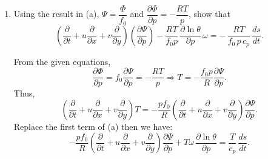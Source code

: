 \documentclass[11pt,a4paper]{article}
\begin{document}
{\begin{enumerate}[label=(\alph*)]
    \item Using the result in (a), $\Psi = \dfrac{\Phi}{f_0}$ and $\dfrac{\partial\Phi}{\partial p} = -\dfrac{RT}{p}$, show that
    \[
        \left(\frac{\partial}{\partial t} + u\frac{\partial}{\partial x} + v\frac{\partial}{\partial y}\right) \left(\frac{\partial\Psi}{\partial p}\right) - \frac{RT}{f_0 p}\,\frac{\partial\ln\theta}{\partial p}\,\omega = -\,\frac{RT}{f_0\, p\, c_p}\,\frac{ds}{dt}.
    \]

\begin{solution}
    From the given equations, $$\dfrac{\partial \Phi}{\partial p}= f_0 \dfrac{\partial \Psi}{\partial p}=-\dfrac{RT}{p}\Rightarrow T = -\frac{f_0 p}{R}\frac{\partial \Psi}{\partial p}.$$
    Thus, $$\left(\frac{\partial}{\partial t} + u\frac{\partial}{\partial x} + v\frac{\partial}{\partial y}\right)T=-\frac{pf_0}{R} \left(\frac{\partial}{\partial t} + u\frac{\partial}{\partial x} + v\frac{\partial}{\partial y}\right)\frac{\partial \Psi}{\partial p}.$$
    Replace the first term of (a) then we have:
         $$ -\frac{pf_0}{R} \left(\frac{\partial}{\partial t} + u\frac{\partial}{\partial x} + v\frac{\partial}{\partial y}\right)\frac{\partial \Psi}{\partial p} + T\omega\,\frac{\partial\ln\theta}{\partial p} = \frac{T}{c_p}\,\frac{ds}{dt}.$$
\end{solution}


\end{enumerate}}
\end{document}
